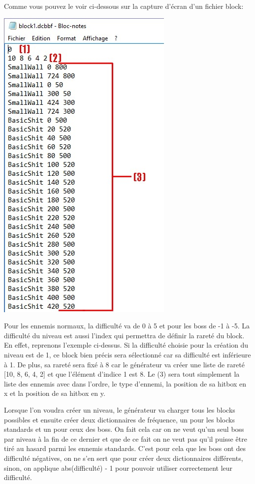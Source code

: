 \documentclass{article}
\begin{document}
Comme vous pouvez le voir ci-dessous sur la capture d'écran d'un fichier block:

\begin{center}
\includegraphics[scale=0.75]{images/explaindcbbf.jpg}
\end{center}

Pour les ennemis normaux, la difficulté va de 0 à 5 et pour les boss de -1 à -5.
La difficulté du niveau est aussi l'index qui permettra de définir la rareté du
block. En effet, reprenons l'exemple ci-dessus. Si la difficulté choisie pour la
création du niveau est de 1, ce block bien précis sera sélectionné car sa
difficulté est inférieure à 1. De plus, sa rareté sera fixé à 8 car le
générateur va créer une liste de rareté [10, 8, 6, 4, 2] et que l'élément
d'indice 1 est 8. Le (3) sera tout simplement la liste des ennemis avec dans
l'ordre, le type d'ennemi, la position de sa hitbox en x et la position de sa
hitbox en y. \newline

Lorsque l'on voudra créer un niveau, le générateur va charger tous les blocks
possibles et ensuite créer deux dictionnaires de fréquence, un pour les blocks
standards et un pour ceux des boss. On fait cela car on ne veut qu'un seul boss
par niveau à la fin de ce dernier et que de ce fait on ne veut pas qu'il puisse
être tiré au hasard parmi les ennemis standards. C'est pour cela que les boss
ont des difficulté négatives, on ne s'en sert que pour créer deux dictionnaires
différents, sinon, on applique abs(difficulté) - 1 pour pouvoir utiliser
correctement leur difficulté. \newline
\end{document}
